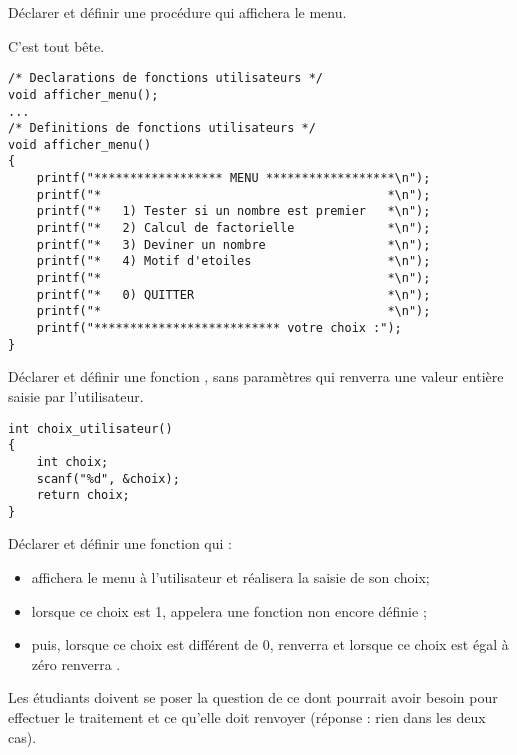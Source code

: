 \begin{lastenu}
\item Déclarer et définir une procédure qui affichera le menu.
  \begin{correction}
    C'est tout bête.
{\footnotesize
\begin{verbatim}
/* Declarations de fonctions utilisateurs */
void afficher_menu();
...
/* Definitions de fonctions utilisateurs */
void afficher_menu()
{
    printf("****************** MENU ******************\n");
    printf("*                                        *\n");
    printf("*   1) Tester si un nombre est premier   *\n");
    printf("*   2) Calcul de factorielle             *\n");
    printf("*   3) Deviner un nombre                 *\n");
    printf("*   4) Motif d'etoiles                   *\n");
    printf("*                                        *\n");
    printf("*   0) QUITTER                           *\n");
    printf("*                                        *\n");
    printf("************************** votre choix :");
}
\end{verbatim}
}
\end{correction}

\item Déclarer et définir une fonction , sans paramètres qui renverra une valeur entière saisie par l'utilisateur.

  \begin{correction}
{\footnotesize
\begin{verbatim}
int choix_utilisateur()
{
    int choix;
    scanf("%d", &choix);
    return choix;
}
\end{verbatim}
}
  \end{correction}

\item Déclarer et définir une fonction  qui :
  \begin{itemize}
  \item affichera le menu à l'utilisateur et réalisera la saisie de son choix;
  \item lorsque ce choix est 1, appelera une fonction non encore définie ;
    \item puis, lorsque ce choix est différent de $0$, renverra  et lorsque ce choix est égal à zéro renverra .
  \end{itemize}

  \begin{correction}
    Les étudiants doivent se poser la question de ce dont pourrait
    avoir besoin  pour effectuer le traitement et ce
    qu'elle doit renvoyer (réponse : rien dans les deux cas).


\end{correction}
\end{lastenu}
